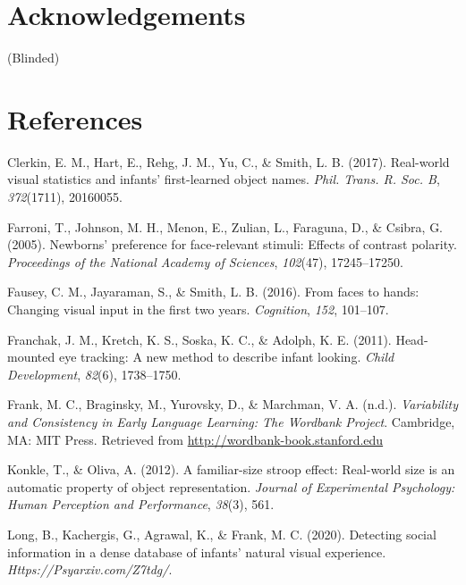 \documentclass[10pt, letterpaper]{article}
\begin{document}
\hypertarget{acknowledgements}{%
\section{Acknowledgements}\label{acknowledgements}}

(Blinded)

\hypertarget{references}{%
\section{References}\label{references}}

\setlength{\parindent}{-0.1in} 
\setlength{\leftskip}{0.125in}

\noindent

\hypertarget{refs}{}
\leavevmode\hypertarget{ref-clerkin2017}{}%
Clerkin, E. M., Hart, E., Rehg, J. M., Yu, C., \& Smith, L. B. (2017).
Real-world visual statistics and infants' first-learned object names.
\emph{Phil. Trans. R. Soc. B}, \emph{372}(1711), 20160055.

\leavevmode\hypertarget{ref-farroni2005newborns}{}%
Farroni, T., Johnson, M. H., Menon, E., Zulian, L., Faraguna, D., \&
Csibra, G. (2005). Newborns' preference for face-relevant stimuli:
Effects of contrast polarity. \emph{Proceedings of the National Academy
of Sciences}, \emph{102}(47), 17245--17250.

\leavevmode\hypertarget{ref-fausey2016}{}%
Fausey, C. M., Jayaraman, S., \& Smith, L. B. (2016). From faces to
hands: Changing visual input in the first two years. \emph{Cognition},
\emph{152}, 101--107.

\leavevmode\hypertarget{ref-franchak2011}{}%
Franchak, J. M., Kretch, K. S., Soska, K. C., \& Adolph, K. E. (2011).
Head-mounted eye tracking: A new method to describe infant looking.
\emph{Child Development}, \emph{82}(6), 1738--1750.

\leavevmode\hypertarget{ref-frank2020}{}%
Frank, M. C., Braginsky, M., Yurovsky, D., \& Marchman, V. A. (n.d.).
\emph{Variability and Consistency in Early Language Learning: The
Wordbank Project}. Cambridge, MA: MIT Press. Retrieved from
\url{http://wordbank-book.stanford.edu}

\leavevmode\hypertarget{ref-konkle2012familiar}{}%
Konkle, T., \& Oliva, A. (2012). A familiar-size stroop effect:
Real-world size is an automatic property of object representation.
\emph{Journal of Experimental Psychology: Human Perception and
Performance}, \emph{38}(3), 561.

\leavevmode\hypertarget{ref-long2020}{}%
Long, B., Kachergis, G., Agrawal, K., \& Frank, M. C. (2020). Detecting
social information in a dense database of infants' natural visual
experience. \emph{Https://Psyarxiv.com/Z7tdg/}.
\end{document}

